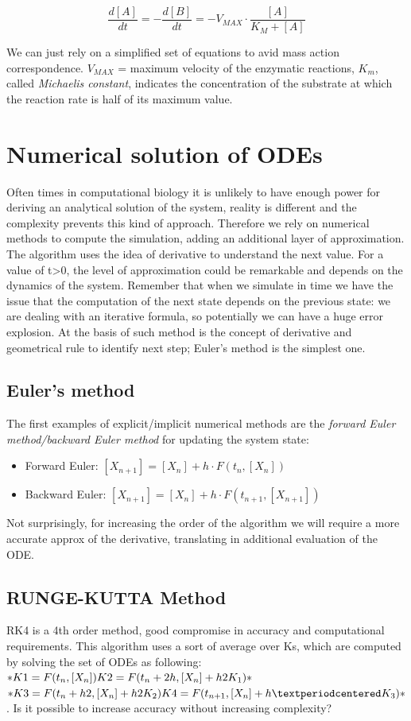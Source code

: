$$\frac{d[A]}{dt}= - \frac{d[B]}{dt}= -V_{MAX}\cdot \frac{[A]}{K_M+[A]}$$

We can just rely on a simplified set of equations to avid mass action correspondence.
$V_{MAX}$ = maximum velocity of the enzymatic reactions, $K_m$, called \emph{Michaelis constant}, indicates the concentration of the substrate at which the reaction rate is half of its maximum value.

\section{Numerical solution of ODEs}
Often times in computational biology it is unlikely to have enough power for deriving an analytical solution of the system, reality is different and the complexity prevents this kind of approach.
Therefore we rely on numerical methods to compute the simulation, adding an additional layer of approximation.
The algorithm uses the idea of derivative to understand the next value.
For a value of t\textgreater0, the level of approximation could be remarkable and depends on the dynamics of the system.
Remember that when we simulate in time we have the issue that the computation of the next state depends on the previous state: we are dealing with an iterative formula, so potentially we can have a huge error explosion.
At the basis of such method is the concept of derivative and geometrical rule to identify next step; Euler's method is the simplest one.

  \subsection{Euler's method}
  The first examples of explicit/implicit numerical methods are the \emph{forward Euler method/backward Euler method} for updating the system state:

  \begin{itemize}
    \item Forward Euler: $[X_{n+1}] = [X_n]+h·F(t_n,[X_n])$
    \item Backward Euler: $[X_{n+1}] = [X_n]+h·F(t_{n+1},[X_{n+1}])$
  \end{itemize}

  Not surprisingly, for increasing the order of the algorithm we will require a more accurate approx of the derivative, translating in additional evaluation of the ODE.

  \subsection{RUNGE-KUTTA Method}
  RK4 is a 4th order method, good compromise in accuracy and computational requirements.
  This algorithm uses a sort of average over Ks, which are computed by solving the set of ODEs as following: $*K1 = F(t_n,[X_n])\\ K2 = F(t_n + 2h,[X_n]+ h2K_1)*$ $*K3 = F(t_n + h2,[X_n]+ h2K_2)\\ K4 = F(t_{n+1},[X_n]+h·K_3)*$.
  Is it possible to increase accuracy without increasing complexity? 

